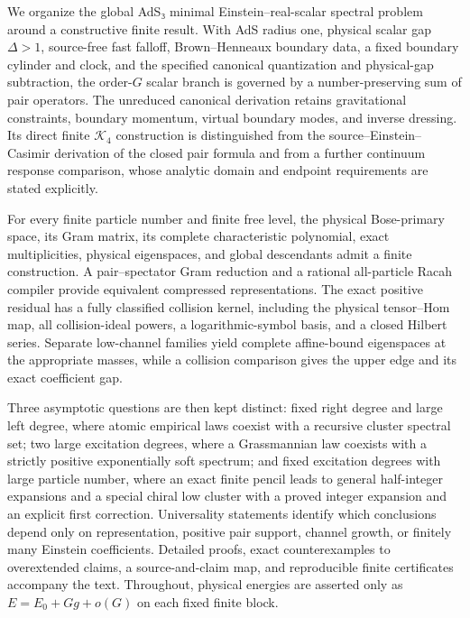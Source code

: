 We organize the global AdS₃ minimal Einstein--real-scalar spectral problem around a constructive finite result. With AdS radius one, physical scalar gap \(\Delta>1\), source-free fast falloff, Brown--Henneaux boundary data, a fixed boundary cylinder and clock, and the specified canonical quantization and physical-gap subtraction, the order-\(G\) scalar branch is governed by a number-preserving sum of pair operators. The unreduced canonical derivation retains gravitational constraints, boundary momentum, virtual boundary modes, and inverse dressing. Its direct finite \(\mathcal K_4\) construction is distinguished from the source--Einstein--Casimir derivation of the closed pair formula and from a further continuum response comparison, whose analytic domain and endpoint requirements are stated explicitly.

For every finite particle number and finite free level, the physical Bose-primary space, its Gram matrix, its complete characteristic polynomial, exact multiplicities, physical eigenspaces, and global descendants admit a finite construction. A pair--spectator Gram reduction and a rational all-particle Racah compiler provide equivalent compressed representations. The exact positive residual has a fully classified collision kernel, including the physical tensor--Hom map, all collision-ideal powers, a logarithmic-symbol basis, and a closed Hilbert series. Separate low-channel families yield complete affine-bound eigenspaces at the appropriate masses, while a collision comparison gives the upper edge and its exact coefficient gap.

Three asymptotic questions are then kept distinct: fixed right degree and large left degree, where atomic empirical laws coexist with a recursive cluster spectral set; two large excitation degrees, where a Grassmannian law coexists with a strictly positive exponentially soft spectrum; and fixed excitation degrees with large particle number, where an exact finite pencil leads to general half-integer expansions and a special chiral low cluster with a proved integer expansion and an explicit first correction. Universality statements identify which conclusions depend only on representation, positive pair support, channel growth, or finitely many Einstein coefficients. Detailed proofs, exact counterexamples to overextended claims, a source-and-claim map, and reproducible finite certificates accompany the text. Throughout, physical energies are asserted only as \(E=E_0+Gg+o(G)\) on each fixed finite block.
